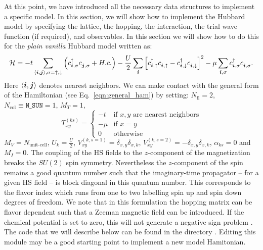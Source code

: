 

At this point, we have introduced all the necessary  data structures   to implement a specific model.  In this section, we will show how to implement the Hubbard model  by specifying the lattice, the hopping, the interaction, the trial wave function  (if  required), and  observables.  In this section we will  show how to do this for  the  \textit{plain vanilla}  Hubbard model  written as: 
\begin{equation}
\label{eqn_hubbard_Mz}
\mathcal{H}=
- t 
\sum\limits_{\langle \ve{i}, \ve{j} \rangle,  \sigma={\uparrow,\downarrow}} 
  \left(  c^{\dagger}_{\ve{i}, \sigma} c^{\phantom\dagger}_{\ve{j},\sigma}  + H.c. \right) 
- \frac{U}{2}\sum\limits_{\ve{i}}\left[
c^{\dagger}_{\ve{i}, \uparrow} c^{\phantom\dagger}_{\ve{i}, \uparrow}  -   c^{\dagger}_{\ve{i}, \downarrow} c^{\phantom\dagger}_{\ve{i}, \downarrow}  \right]^{2}   
-  \mu \sum_{\ve{i},\sigma } c^{\dagger}_{\ve{i}, \sigma}  c^{\phantom\dagger}_{\ve{i},\sigma}. 
\end{equation} 
Here $ \langle \boldsymbol{i}, \boldsymbol{j} \rangle $    denotes nearest neighbors. 
We can make contact with the general form of the Hamiltonian  (see Eq.~\ref{eqn:general_ham}) by setting: 
$N_{\mathrm{fl}} = 2$, $N_{\mathrm{col}} \equiv \texttt{N\_SUN}     =1 $, 
 $M_T    =    1$, 
 \begin{equation}
  T^{(ks)}_{x y}   = 
  \left\{ 
 \begin{array}{ll}
       -t         & \text{if } x,y \text{ are nearest neighbors} \\
       -\mu    & \text{if } x = y \\
       0         &  \text{otherwise}
 \end{array}
  \right.
 \end{equation}
 $M_V   =  N_{\text{unit-cell}} $,  $U_{k}       =   \frac{U}{2}$, 
 $V_{x y}^{(k, s=1)} =  \delta_{x,y} \delta_{x,k}  $,  $V_{x y}^{(k, s=2)} =  - \delta_{x,y} \delta_{x,k}  $,  $\alpha_{ks}   = 0  $ and $M_I       = 0 $.   
 The coupling of the HS fields to the $z$-component of   the magnetization breaks the $SU(2)$ spin symmetry. Nevertheless the $z$-component of the spin remains a good quantum number such that the imaginary-time propagator -- for a given HS field -- is block  diagonal in this quantum number. This corresponds to the flavor index  which runs from one to two  labelling spin up and spin down  degrees of freedom.     We note that  in this formulation the  hopping matrix can be flavor dependent such that a Zeeman  magnetic field can be introduced.  If the chemical potential is set to zero, this will not generate a negative sign problem \cite{Wu04,Milat04,Bercx09}.    
The code that we will describe below  can be found in the  directory .   Editing this module  may be a good starting point to implement a new model   Hamitonian. 

